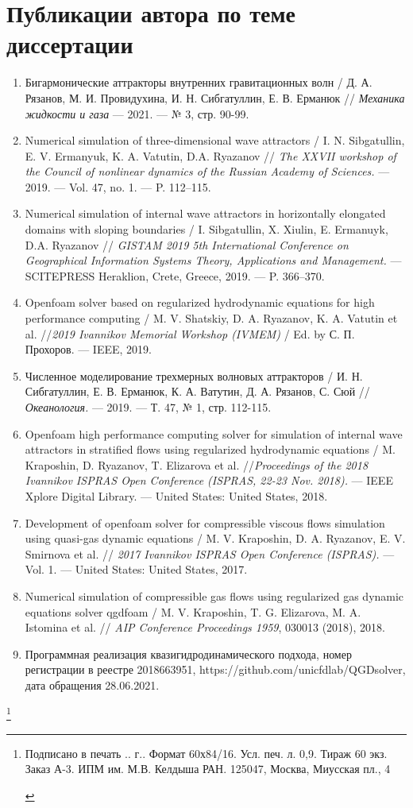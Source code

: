 \documentclass[utf8x]{G7-32} %
\newcommand\blfootnote[1]{%
  \begingroup
  \renewcommand\thefootnote{}\footnote{#1}%
  \addtocounter{footnote}{-1}%
  \endgroup
}
\begin{document}
\section*{Публикации автора по теме диссертации}
\footnotesize{
\begin{enumerate}[1.]
  \item Бигармонические аттракторы внутренних гравитационных волн / Д. А. Рязанов, М. И. Провидухина, И. Н. Сибгатуллин, Е. В. Ерманюк // \textit{Механика жидкости и газа}  — 2021. — № 3, стр. 90-99. 
  \item Numerical simulation of three-dimensional wave attractors / I. N. Sibgatullin, E. V. Ermanyuk, K. A. Vatutin, D.A. Ryazanov // \textit{The XXVII workshop of the Council of nonlinear dynamics of the Russian Academy of Sciences.} — 2019. — Vol. 47, no. 1. — P. 112–115.
  \item Numerical simulation of internal wave attractors in horizontally elongated domains with sloping boundaries / I. Sibgatullin, X. Xiulin, E. Ermanuyk, D.A. Ryazanov // \textit{GISTAM 2019 5th International Conference on Geographical Information Systems Theory, Applications and Management.} — SCITEPRESS Heraklion, Crete, Greece, 2019. — P. 366–370.
  \item Openfoam solver based on regularized hydrodynamic equations for high performance computing / M. V. Shatskiy, D. A. Ryazanov, K. A. Vatutin et al. //\textit{2019 Ivannikov Memorial Workshop (IVMEM)} / Ed. by С. П. Прохоров. — IEEE, 2019.
  \item  Численное моделирование трехмерных волновых аттракторов / И. Н. Сибгатуллин, Е. В. Ерманюк, К. А. Ватутин, Д. А. Рязанов, С. Сюй //\textit{Океанология.} — 2019. — Т. 47, № 1, стр. 112-115.
  \item Openfoam high performance computing solver for simulation of internal wave attractors in stratified flows using regularized hydrodynamic equations / M. Kraposhin, D. Ryazanov, T. Elizarova et al. //\textit{Proceedings of the 2018 Ivannikov ISPRAS Open Conference (ISPRAS, 22-23 Nov. 2018).} — IEEE Xplore Digital Library. — United States: United States, 2018.
  \item Development of openfoam solver for compressible viscous flows simulation using quasi-gas dynamic equations / M. V. Kraposhin, D. A. Ryazanov, E. V. Smirnova et al. // \textit{2017 Ivannikov ISPRAS Open Conference (ISPRAS).} — Vol. 1. — United States: United States, 2017.
  \item Numerical simulation of compressible gas flows using regularized gas dynamic equations solver qgdfoam / M. V. Kraposhin, T. G. Elizarova, M. A. Istomina et al. // \textit{AIP Conference Proceedings 1959}, 030013 (2018), 2018.
  \item Программная реализация квазигидродинамического подхода, номер регистрации в реестре 2018663951, https://github.com/unicfdlab/QGDsolver, дата обращения 28.06.2021.
\end{enumerate}
}


\blfootnote{
\begin{centering}
    Подписано в печать \underline{\hspace{0.3cm}}.\underline{\hspace{0.3cm}}.\underline{\hspace{0.3cm}} г.. Формат 60х84/16.  Усл. печ. л. 0,9. Тираж 60 экз. Заказ А-3. ИПМ им. М.В. Келдыша РАН. 125047, Москва, Миусская пл., 4
\end{centering}
}
\end{document}
